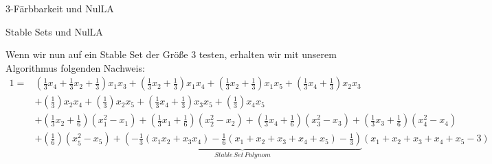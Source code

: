 \begin{mslide}{3-Färbbarkeit und NulLA}
\begin{mslide}{Stable Sets und NulLA}
\begin{ex}
\begin{figure}
\begin{center}
\end{center}
\end{figure}
\end{ex}
\framebreak
\begin{block}{}
Wenn wir nun auf ein Stable Set der Größe 3 testen, erhalten wir mit unserem Algorithmus folgenden Nachweis:
\scriptsize{
\begin{align*}
1 = &\left(\frac{1}{3}x_4+\frac{1}{3}x_2+\frac{1}{3}\right)x_1x_3 + \left(\frac{1}{3}x_2+\frac{1}{3}\right)x_1x_4 + \left(\frac{1}{3}x_2+\frac{1}{3}\right)x_1x_5 + \left(\frac{1}{3}x_4+\frac{1}{3}\right)x_2x_3\\ &+ \left(\frac{1}{3}\right)x_2x_4 + \left(\frac{1}{3}\right)x_2x_5 + \left(\frac{1}{3}x_4 +\frac{1}{3}\right)x_3x_5 + \left(\frac{1}{3}\right)x_4x_5 \\ &+ \left(\frac{1}{3}x_2+\frac{1}{6}\right)(x_1^2-x_1) + \left(\frac{1}{3}x_1+\frac{1}{6}\right)(x_2^2-x_2) + \left(\frac{1}{3}x_4+\frac{1}{6}\right)(x_3^2-x_3) + \left(\frac{1}{3}x_3+\frac{1}{6}\right)(x_4^2-x_4) \\ &+ \left(\frac{1}{6}\right)(x_5^2-x_5) + \underbrace{\left(-\frac{1}{3}(x_1x_2 + x_3x_4)-\frac{1}{6}(x_1+x_2+x_3+x_4+x_5)-\frac{1}{3}\right)}_{Stable \, Set \, Polynom} (x_1+x_2+x_3+x_4+x_5-3)
\end{align*}
}
\end{block}


\end{mslide}
\end{mslide}
